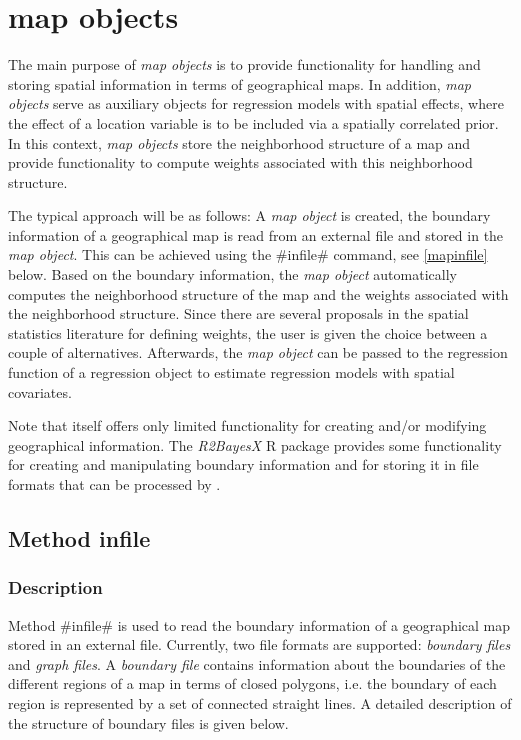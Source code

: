 \chapter{map objects}
\label{map} 

The main purpose of {\em map objects} is to provide functionality for handling and storing spatial information in terms of geographical maps. In addition, {\em map objects} serve as auxiliary objects for regression models with spatial effects, where the effect of a location variable is to be included via a spatially correlated prior. In this context, {\em map objects} store the neighborhood structure of a map and provide functionality to compute weights associated with this neighborhood structure.

The typical approach will be as follows: A {\em map object} is created, the boundary information of a geographical map is read from an external file and stored in the {\em map object}. This can be achieved using the #infile# command, see \autoref{mapinfile} below. Based on the boundary information, the {\em map object} automatically computes the neighborhood structure of the map and the weights associated with the neighborhood structure. Since there are several proposals in the spatial statistics literature for defining weights, the user is given the choice between a couple of alternatives.  Afterwards, the {\em map object} can be passed to the regression function of a regression object to estimate regression models with spatial covariates.

Note that \BayesX itself offers only limited functionality for creating and/or modifying geographical information. The {\it R2BayesX} R package provides some functionality for creating and manipulating boundary information and for storing it in file formats that can be processed by \BayesX.

\section{Method infile}
 \label{mapinfile}

\subsection{Description}

Method #infile# is used to read the boundary information of a geographical map stored in an external file. Currently, two file formats are supported: {\em boundary files} and {\em graph files}. A {\em boundary file} contains information about the boundaries of the different regions of a map in terms of closed polygons, i.e. the boundary of each region is represented by a set of connected straight lines. A detailed description of the structure of boundary files is given below.

